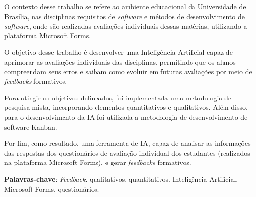 \begin{resumo}

    O contexto desse trabalho se refere ao ambiente educacional da Universidade de Brasília, nas disciplinas requisitos de \textit{software} e métodos de desenvolvimento de \textit{software}, onde são realizadas avaliações individuais dessas matérias, utilizando a plataforma Microsoft Forms. 

    O objetivo desse trabalho é desenvolver uma Inteligência Artificial capaz de aprimorar as avaliações individuais das disciplinas, permitindo que os alunos compreendam seus erros e saibam como evoluir em futuras avaliações por meio de \textit{feedbacks} formativos.

    Para atingir os objetivos delineados, foi implementada uma metodologia de pesquisa mista, incorporando elementos quantitativos e qualitativos. Além disso, para o desenvolvimento da IA foi utilizada a metodologia de desenvolvimento de software Kanban.

    Por fim, como resultado, uma ferramenta de IA, capaz de analisar as informações das respostas dos questionários de avaliação individual dos estudantes (realizados na plataforma Microsoft Forms), e gerar \textit{feedbacks} formativos.

 \vspace{\onelineskip}
    
 \noindent
 \textbf{Palavras-chave}: \textit{Feedback}. qualitativos. quantitativos. Inteligência Artificial. Microsoft Forms. questionários. 
\end{resumo}
